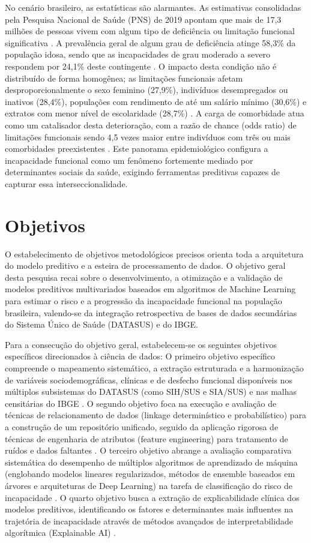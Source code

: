 \documentclass[12pt,openright,oneside,a4paper,brazil]{abntex2}
\begin{document}
No cenário brasileiro, as estatísticas são alarmantes. As estimativas consolidadas pela Pesquisa Nacional de Saúde (PNS) de 2019 apontam que mais de 17,3 milhões de pessoas vivem com algum tipo de deficiência ou limitação funcional significativa \cite{ref5}. A prevalência geral de algum grau de deficiência atinge 58,3\% da população idosa, sendo que as incapacidades de grau moderado a severo respondem por 24,1\% deste contingente \cite{ref6}. O impacto desta condição não é distribuído de forma homogênea; as limitações funcionais afetam desproporcionalmente o sexo feminino (27,9\%), indivíduos desempregados ou inativos (28,4\%), populações com rendimento de até um salário mínimo (30,6\%) e extratos com menor nível de escolaridade (28,7\%) \cite{ref6, ref7}. A carga de comorbidade atua como um catalisador desta deterioração, com a razão de chance (odds ratio) de limitações funcionais sendo 4,5 vezes maior entre indivíduos com três ou mais comorbidades preexistentes \cite{ref6}. Este panorama epidemiológico configura a incapacidade funcional como um fenômeno fortemente mediado por determinantes sociais da saúde, exigindo ferramentas preditivas capazes de capturar essa interseccionalidade.

\section{Objetivos}
O estabelecimento de objetivos metodológicos precisos orienta toda a arquitetura do modelo preditivo e a esteira de processamento de dados. O objetivo geral desta pesquisa recai sobre o desenvolvimento, a otimização e a validação de modelos preditivos multivariados baseados em algoritmos de Machine Learning para estimar o risco e a progressão da incapacidade funcional na população brasileira, valendo-se da integração retrospectiva de bases de dados secundárias do Sistema Único de Saúde (DATASUS) e do IBGE.

Para a consecução do objetivo geral, estabelecem-se os seguintes objetivos específicos direcionados à ciência de dados:
O primeiro objetivo específico compreende o mapeamento sistemático, a extração estruturada e a harmonização de variáveis sociodemográficas, clínicas e de desfecho funcional disponíveis nos múltiplos subsistemas do DATASUS (como SIH/SUS e SIA/SUS) e nas malhas censitárias do IBGE \cite{ref8}. O segundo objetivo foca na execução e avaliação de técnicas de relacionamento de dados (linkage determinístico e probabilístico) para a construção de um repositório unificado, seguido da aplicação rigorosa de técnicas de engenharia de atributos (feature engineering) para tratamento de ruídos e dados faltantes \cite{ref9}. O terceiro objetivo abrange a avaliação comparativa sistemática do desempenho de múltiplos algoritmos de aprendizado de máquina (englobando modelos lineares regularizados, métodos de ensemble baseados em árvores e arquiteturas de Deep Learning) na tarefa de classificação do risco de incapacidade \cite{ref10, ref11}. O quarto objetivo busca a extração de explicabilidade clínica dos modelos preditivos, identificando os fatores e determinantes mais influentes na trajetória de incapacidade através de métodos avançados de interpretabilidade algorítmica (Explainable AI) \cite{ref11}.
\end{document}
